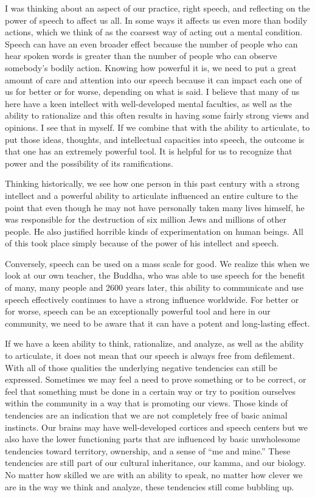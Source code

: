 
I was thinking about an aspect of our practice, right speech, and 
reflecting on the power of speech to affect us all. In some ways it 
affects us even more than bodily actions, which we think of as the 
coarsest way of acting out a mental condition. Speech can have an even 
broader effect because the number of people who can hear spoken words 
is greater than the number of people who can observe somebody's bodily 
action. Knowing how powerful it is, we need to put a great amount of 
care and attention into our speech because it can impact each one of us 
for better or for worse, depending on what is said. I believe that many 
of us here have a keen intellect with well-developed mental faculties, 
as well as the ability to rationalize and this often results in having 
some fairly strong views and opinions. I see that in myself. If we 
combine that with the ability to articulate, to put those ideas, 
thoughts, and intellectual capacities into speech, the outcome is that 
one has an extremely powerful tool. It is helpful for us to recognize 
that power and the possibility of its ramifications.

Thinking historically, we see how one person in this past century with 
a strong intellect and a powerful ability to articulate influenced an 
entire culture to the point that even though he may not have personally 
taken many lives himself, he was responsible for the destruction of six 
million Jews and millions of other people. He also justified horrible 
kinds of experimentation on human beings. All of this took place simply 
because of the power of his intellect and speech.

Conversely, speech can be used on a mass scale for good. We realize 
this when we look at our own teacher, the Buddha, who was able to use 
speech for the benefit of many, many people and 2600 years later, this 
ability to communicate and use speech effectively continues to have a 
strong influence worldwide. For better or for worse, speech can be an 
exceptionally powerful tool and here in our community, we need to be 
aware that it can have a potent and long-lasting effect.

If we have a keen ability to think, rationalize, and analyze, as well 
as the ability to articulate, it does not mean that our speech is 
always free from defilement. With all of those qualities the underlying 
negative tendencies can still be expressed. Sometimes we may feel a 
need to prove something or to be correct, or feel that something must 
be done in a certain way or try to position ourselves within the 
community in a way that is promoting our views. Those kinds of 
tendencies are an indication that we are not completely free of basic 
animal instincts. Our brains may have well-developed cortices and 
speech centers but we also have the lower functioning parts that are 
influenced by basic unwholesome tendencies toward territory, ownership, 
and a sense of ``me and mine.'' These tendencies are still part of our 
cultural inheritance, our kamma, and our biology. No matter how skilled 
we are with an ability to speak, no matter how clever we are in the way 
we think and analyze, these tendencies still come bubbling up.

